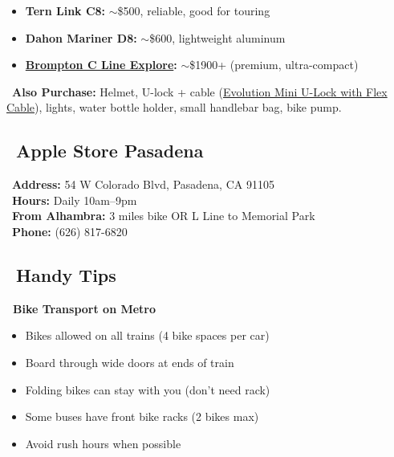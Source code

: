 \documentclass[10pt,letterpaper]{article}
\begin{document}
\begin{tipbox}[title=Recommended Folding Bikes (\$300--800):]
\begin{small}
\begin{itemize}[leftmargin=0.2in,itemsep=1pt]
\item \textbf{Tern Link C8:} $\sim$\$500, reliable, good for touring
\item \textbf{Dahon Mariner D8:} $\sim$\$600, lightweight aluminum
\item \textbf{\href{https://www.rei.com/product/224074/brompton-c-line-explore-folding-bike-mid}{Brompton C Line Explore}:} $\sim$\$1900+ (premium, ultra-compact)
\end{itemize}

\faShoppingBag\ \textbf{Also Purchase:} Helmet, U-lock + cable (\href{https://www.rei.com/product/188310/kryptonite-evolution-mini-u-lock-with-flex-cable}{Evolution Mini U-Lock with Flex Cable}), lights, water bottle holder, small handlebar bag, bike pump.
\end{small}
\end{tipbox}

\subsection*{\faApple\ Apple Store Pasadena}

\begin{infobox}
\faMapMarker\ \textbf{Address:} 54 W Colorado Blvd, Pasadena, CA 91105\\
\faClock\ \textbf{Hours:} Daily 10am--9pm\\
\faBicycle\ \textbf{From Alhambra:} 3 miles bike OR \colorbox{yellow!80}{L Line} to Memorial Park\\
\faPhone\ \textbf{Phone:} (626) 817-6820
\end{infobox}

\subsection*{\faLightbulb\ Handy Tips}

\begin{infobox}[colback=gray!10,colframe=gray]
\textbf{\faBicycle\ Bike Transport on Metro}
\begin{small}
\begin{itemize}[leftmargin=0.2in,itemsep=0pt]
\item Bikes allowed on all trains (4 bike spaces per car)
\item Board through wide doors at ends of train
\item Folding bikes can stay with you (don't need rack)
\item Some buses have front bike racks (2 bikes max)
\item Avoid rush hours when possible
\end{itemize}
\end{small}
\end{infobox}
\end{document}
